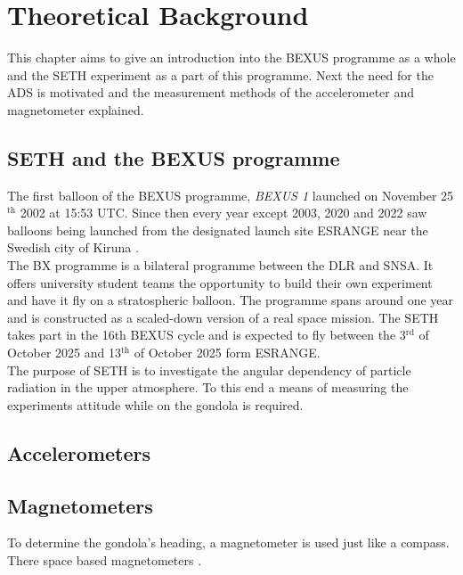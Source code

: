 \chapter{Theoretical Background \label{ch:background}}
This chapter aims to give an introduction into the \acf{BEXUS} programme as a whole and the \acf{SETH} experiment as a part of this programme. Next the need for the \acf{ADS} is motivated and the measurement methods of the accelerometer and magnetometer explained.

\section{\acs{SETH} and the \acs{BEXUS} programme \label{sec:seth_and_bx_programme}}

The first balloon of the \ac{BEXUS} programme, \textit{BEXUS 1} launched on November 25$^{\mathrm{th}}$ 2002 at 15:53 UTC. Since then every year except 2003, 2020 and 2022 saw balloons being launched from the designated launch site \acf{ESRANGE} near the Swedish city of Kiruna \cite{IAC-08.E.1.1.4}\cite{bexus-campaign-history}.\\
The \acf{BX} programme is a bilateral programme between the \acf{DLR} and \acf{SNSA}. It offers university student teams the opportunity to build their own experiment and have it fly on a stratospheric balloon. The programme spans around one year and is constructed as a scaled-down version of a real space mission. The \acf{SETH} takes part in the 16th \ac{BEXUS} cycle and is expected to fly between the 3$^\mathrm{rd}$ of October 2025 and 13$^\mathrm{th}$ of October 2025 form \ac{ESRANGE}.\\

The purpose of \ac{SETH} is to investigate the angular dependency of particle radiation in the upper atmosphere. To this end a means of measuring the experiments attitude while on the gondola is required. 

\section{Accelerometers \label{sec:accelerometers}}

\section{Magnetometers \label{sec:magnetometers}}
To determine the gondola's heading, a magnetometer is used just like a compass. There space based magnetometers \cite{space-based-magnetometers-review}.